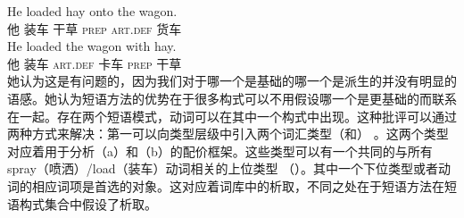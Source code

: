 \begin{exe}
\begin{xlist}[iv.]
\begin{exe}
\begin{xlist}[iv.]
\eal
\ex
\gll He loaded hay onto the wagon.\\
     他 装车 干草 \textsc{prep} \textsc{art}.\textsc{def} 货车\\
\ex
\gll He loaded the wagon with hay.\\
     他 装车 \textsc{art}.\textsc{def} 卡车 \textsc{prep} 干草\\
\zl
她认为这是有问题的，因为我们对于哪一个是基础的哪一个是派生的并没有明显的语感。她认为短语方法的优势在于很多构式可以不用假设哪一个是更基础的而联系在一起。存在两个短语模式，动词可以在其中一个构式中出现。这种批评可以通过两种方式来解决：第一可以向类型层级中引入两个词汇类型（和） 。这两个类型对应着用于分析（a）和（b）的配价框架。这些类型可以有一个共同的与所有spray（喷洒）/load（装车）动词相关的上位类型 （）。其中一个下位类型或者动词的相应词项是首选的对象。这对应着词库中的析取，不同之处在于短语方法在短语构式集合中假设了析取。


\end{xlist}
\end{exe}
\end{xlist}
\end{exe}
